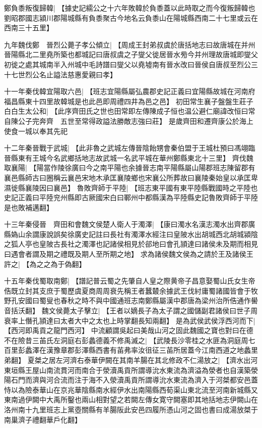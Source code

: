 鄭負黍叛復歸韓|{
	【據史記繻公之十六年敗韓於負黍蓋以此時取之而今復叛歸韓也劉昭郡國志潁川郡陽城縣有負黍聚古今地名云負黍山在陽城縣西南二十七里或云在西南三十五里】}
\par
九年魏伐鄭　晉烈公薨子孝公傾立|{
	【周成王封弟叔虞於唐括地志曰故唐城在并州晉陽縣北二里堯所築也都城記曰唐叔虞之子燮父徙居晉水㫄今并州理故唐城即燮父初徙之處其城南半入州城中毛詩譜曰燮父以堯墟南有晉水改曰晉侯自唐叔至烈公三十七世烈公名止謚法慈惠愛親曰孝】}
\par
十一年秦伐韓宜陽取六邑|{
	【班志宜陽縣屬弘農郡史記正義曰宜陽縣故城在河南府福昌縣東十四里故韓城是也此邑即周禮四井為邑之邑】}
初田常生襄子盤盤生莊子白白生太公和|{
	【此序齊田氏之世也田常即左傳陳成子恒也温公避仁廟諱改恒曰常自陳公子完奔齊　五世至常得政謚法勝敵志強曰莊】}
是歲齊田和遷齊康公於海上使食一城以奉其先祀
\par
十二年秦晉戰于武城|{
	【此非魯之武城左傳晉陰飴甥會秦伯盟于王城杜預曰馮翊臨晉縣東有王城今名武鄉括地志故武城一名武平城在華州鄭縣東北十三里】}
齊伐魏取襄陽|{
	【陽當作陵徐廣曰今之南平陽也余據晉志南平陽縣屬山陽郡班志陳留郡有襄邑縣師古曰圈稱云襄邑宋地木承匡襄陵鄉也宋襄公所葬故曰襄陵秦始皇以承匡卑濕徙縣襄陵因曰襄邑】}
魯敗齊師于平陸|{
	【班志東平國有東平陸縣戰國時之平陸也史記正義曰平陸兖州縣即古厥國宋白曰鄆州中都縣漢為平陸縣史記魯敗齊師于平陸是也敗補邁翻】}
\par
十三年秦侵晉　齊田和會魏文侯楚人衛人于濁澤|{
	【康曰濁水名漢志濁水出齊郡廣縣媯山余謂康說誤矣徐廣史記註曰長社有濁澤水經注曰皇陂水出胡城西北胡城潁陰之狐人亭也皇陂古長社之濁澤也記諸侯相見於郤地曰會孔頴達曰諸侯未及期而相見曰遇會者謂及期之禮既及期人至所期之地】}
求為諸侯魏文侯為之請於王及諸侯王許之|{
	【為之之為于偽翻】}
\par
十五年秦伐蜀取南鄭|{
	【譜記普云蜀之先肇自人皇之際黄帝子昌意娶蜀山氏女生帝俈既立封其支庶于蜀歷虞夏商周周衰先稱王者蠶樷余據武王伐紂庸蜀諸國皆會于牧野孔安國曰蜀叟也春秋之時不與中國通班志南鄭縣屬漢中郡唐為梁州治所俈通作嚳音括沃翻】}
魏文侯薨太子擊立|{
	【王者以嫡長子為太子謂之國儲副君諸侯曰世子周衰率上僭孔頴達曰太者大中之太也上時掌翻長知兩翻】}
是為武侯武侯浮西河而下|{
	【西河即禹貢之龍門西河】}
中流顧謂吳起曰美哉山河之固此魏國之寶也對曰在德不在險昔三苖氏左洞庭右彭蠡德義不修禹滅之|{
	【武陵長沙零桂之水匪為洞庭周七百里彭蠡澤在漢豫章郡彭澤縣西書有苖弗率汝徂征三苖所居蓋今江南西道之地蠡里弟翻】}
夏桀之居左河濟右泰華伊闕在其南羊腸在其北修政不仁湯放之|{
	【濟水出河東垣縣王屋山南流貫河而南合于滎瀆禹貢所謂導沇水東流為濟溢為滎者也自漢築滎陽石門而濟與河合流而注于海不入滎瀆禹貢所謂導沇水東流為濟入于河桀都安邑蓋恃以為險泰華山在京兆華陰縣南水經伊水出南陽縣西荀渠山東北流至河南新城縣又東南過伊闕中大禹所鑿也兩山相對望之若闕左傳女寛守闕塞即其地括地志伊闕山在洛州南十九里班志上黨壺關縣有羊腸阪此安邑四履所憑山河之固也書曰成湯放桀于南巢濟子禮翻華戶化翻】}
